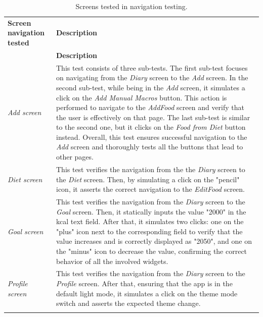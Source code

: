 \documentclass{Configuration_Files/PoliMi3i_thesis}
\begin{document}
\begin{longtable}{|m{6cm}|m{6cm}|}
    \hline
     \multirow{2}{*}{\textbf{Screen navigation tested}} & \multirow{2}{*}{\textbf{Description}} \\[0.5ex]
        & \\[-1ex]
    \hline
    \endfirsthead
    \hline
    \centering
     \multirow{2}{*}{\textbf{Screen navigation tested}} & \multirow{2}{*}{\textbf{Description}} \\[0.5ex]
        & \\[-1ex]
    \hline
    \endhead
    \hline
    \endfoot
    \hline
    \endlastfoot 
    \textit{Add screen} & This test consists of three sub-tests. The first sub-test focuses on navigating from the \textit{Diary} screen to the \textit{Add} screen. In the second sub-test, while being in the \textit{Add} screen, it simulates a click on the \textit{Add Manual Macros} button. This action is performed to navigate to the \textit{AddFood} screen and verify that the user is effectively on that page. The last sub-test is similar to the second one, but it clicks on the \textit{Food from Diet} button instead. Overall, this test ensures successful navigation to the \textit{Add} screen and thoroughly tests all the buttons that lead to other pages. \\
    \hline
    \textit{Diet screen} & This test verifies the navigation from the the \textit{Diary} screen to the \textit{Diet} screen. Then, by simulating a click on the "pencil" icon, it asserts the correct navigation to the \textit{EditFood} screen.\\
    \hline
    \textit{Goal screen} & This test verifies the navigation from the \textit{Diary} screen to the \textit{Goal} screen. Then, it statically inputs the value "2000" in the kcal text field. After that, it simulates two clicks: one on the "plus" icon next to the corresponding field to verify that the value increases and is correctly displayed as "2050", and one on the "minus" icon to decrease the value, confirming the correct behavior of all the involved widgets. \\
    \hline
    \textit{Profile screen} & This test verifies the navigation from the \textit{Diary} screen to the \textit{Profile} screen. After that, ensuring that the app is in the default light mode, it simulates a click on the theme mode switch and asserts the expected theme change. \\
    \hline
    \caption{Screens tested in navigation testing.}
\end{longtable}
\end{document}
